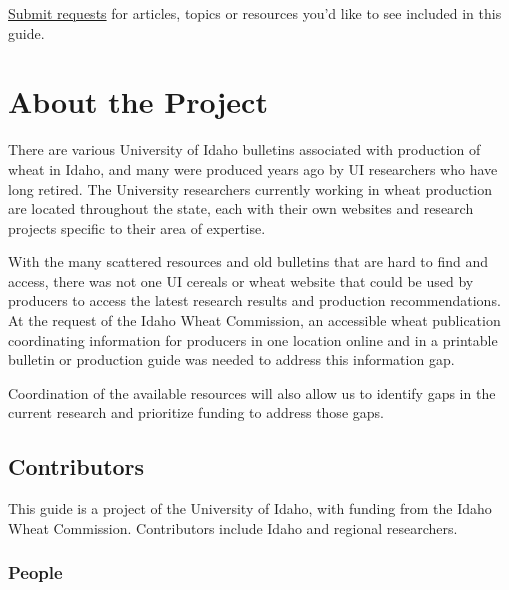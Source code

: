 \documentclass[
  letterpaper,
  DIV=11,
  numbers=noendperiod]{scrreprt}
\begin{document}

\href{mailto:egalvin@uidaho.edu}{Submit requests} for articles, topics
or resources you'd like to see included in this guide.


\chapter*{About the Project}\label{about-the-project}


There are various University of Idaho bulletins associated with
production of wheat in Idaho, and many were produced years ago by UI
researchers who have long retired. The University researchers currently
working in wheat production are located throughout the state, each with
their own websites and research projects specific to their area of
expertise.

With the many scattered resources and old bulletins that are hard to
find and access, there was not one UI cereals or wheat website that
could be used by producers to access the latest research results and
production recommendations. At the request of the Idaho Wheat
Commission, an accessible wheat publication coordinating information for
producers in one location online and in a printable bulletin or
production guide was needed to address this information gap.

Coordination of the available resources will also allow us to identify
gaps in the current research and prioritize funding to address those
gaps.

\section*{Contributors}\label{contributors}


This guide is a project of the University of Idaho, with funding from
the Idaho Wheat Commission. Contributors include Idaho and regional
researchers.

\subsection*{People}\label{people}
\end{document}

